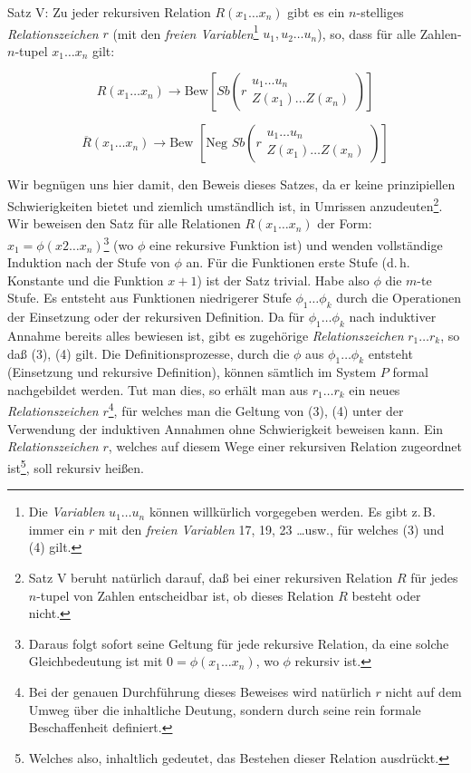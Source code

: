 \documentclass[draft]{scrartcl}
\begin{document}
Satz V: Zu jeder rekursiven Relation $R\left(x_1 \dots x_n\right)$
gibt es ein $n$-stelliges \textit{Relationszeichen} $r$ 
(mit den \textit{freien Variablen}\footnote{Die \textit{Variablen} 
$u_1 \dots u_n$ können willkürlich vorgegeben werden. Es gibt 
z.\,B. immer ein $r$ mit den \textit{freien Variablen} 17, 19, 23 \dots usw., 
für welches (3) und (4) gilt.}
$u_1, u_2 \dots u_n$), so, dass für alle Zahlen-$n$-tupel
$x_1 \dots x_n$ gilt:

\begin{equation}
	R\left(x_1 \dots x_n\right) \longrightarrow \text{Bew}\left[Sb\left(r\substack{u_1 \dots u_n\\ Z\left(x_1\right) \dots Z\left(x_n\right)}\right)\right]
\end{equation}

\begin{equation}
	\overline{R}\left(x_1 \dots x_n\right) \longrightarrow \text{Bew }\left[\text{Neg } Sb\left(r\substack{u_1 \dots u_n \\ Z\left(x_1\right) \dots Z\left(x_n\right)}\right)\right]
\end{equation}

Wir begnügen uns hier damit, den Beweis dieses Satzes, da er keine prinzipiellen Schwierigkeiten bietet und ziemlich umständlich ist, in Umrissen anzudeuten\footnote{Satz V beruht natürlich darauf, daß bei einer rekursiven Relation $R$ für jedes $n$-tupel von Zahlen  entscheidbar ist, ob dieses Relation $R$ besteht oder nicht.}.
Wir beweisen den Satz für alle Relationen $R\left(x_1 \dots x_n\right)$ der Form: $x_1 = \phi\left(x2 \dots x_n\right)$\footnote{Daraus folgt sofort seine Geltung für jede rekursive Relation, da eine solche Gleichbedeutung ist mit $0 = \phi\left(x_1 \dots x_n\right)$, wo $\phi$ rekursiv ist.}
(wo $\phi$ eine rekursive Funktion ist) und wenden vollständige Induktion nach der Stufe von $\phi$ an. Für die Funktionen erste Stufe (d.\,h. Konstante und die Funktion $x + 1$) ist der Satz trivial. Habe also
$\phi$ die $m$-te Stufe. Es entsteht aus Funktionen niedrigerer Stufe $\phi_1 \dots \phi_k$ durch die Operationen der Einsetzung oder der rekursiven Definition. Da für $\phi_1 \dots \phi_k$ nach induktiver Annahme bereits alles bewiesen ist, gibt es zugehörige \textit{Relationszeichen} $r_1 \dots r_k$, so daß (3), (4) gilt. Die Definitionsprozesse, durch die $\phi$ aus $\phi_1 \dots \phi_k$ entsteht (Einsetzung und rekursive Definition), können sämtlich im System $P$ formal nachgebildet werden. Tut man dies, so erhält man aus $r_1 \dots r_k$ ein neues \textit{Relationszeichen} $r$\footnote{Bei der genauen Durchführung dieses Beweises wird natürlich $r$ nicht auf dem Umweg über die inhaltliche Deutung, sondern durch seine rein formale Beschaffenheit definiert.},
für welches man die Geltung von (3), (4) unter der Verwendung der induktiven Annahmen ohne Schwierigkeit beweisen kann. Ein \textit{Relationszeichen} $r$, welches auf diesem Wege einer rekursiven Relation zugeordnet ist\footnote{Welches also, inhaltlich gedeutet, das Bestehen dieser Relation ausdrückt.},
soll rekursiv heißen.
\end{document}
